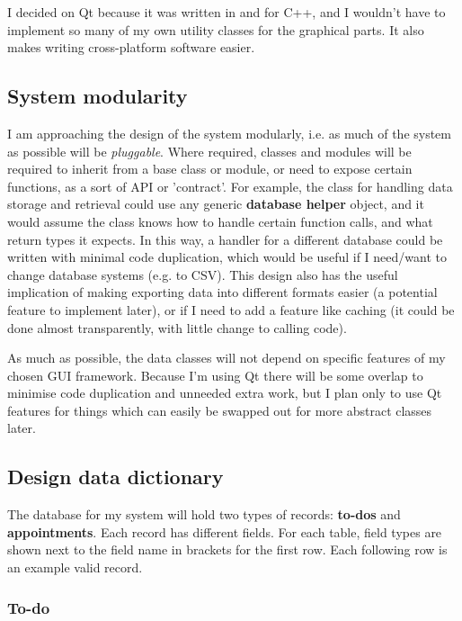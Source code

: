 I decided on Qt because it was written in and for C++, and I wouldn't have to
implement so many of my own utility classes for the graphical parts. It also
makes writing cross-platform software easier.


\subsection{System modularity}

I am approaching the design of the system modularly, i.e. as much of the system
as possible will be \textit{pluggable}. Where required, classes and modules will
be required to inherit from a base class or module, or need to expose certain
functions, as a sort of API or 'contract'. For example, the class for handling
data storage and retrieval could use any generic \textbf{database helper}
object, and it would assume the class knows how to handle certain function
calls, and what return types it expects. In this way, a handler for a different
database could be written with minimal code duplication, which would be useful
if I need/want to change database systems (e.g. to CSV). This design also has
the useful implication of making exporting data into different formats easier (a
potential feature to implement later), or if I need to add a feature like
caching (it could be done almost transparently, with little change to calling
code).

As much as possible, the data classes will not depend on specific features of my
chosen GUI framework. Because I'm using Qt there will be some overlap to
minimise code duplication and unneeded extra work, but I plan only to use Qt
features for things which can easily be swapped out for more abstract classes
later.


\subsection{Design data dictionary}

The database for my system will hold two types of records: \textbf{to-dos} and
\textbf{appointments}. Each record has different fields. For each table, field
types are shown next to the field name in brackets for the first row. Each
following row is an example valid record.


\subsubsection{To-do}

